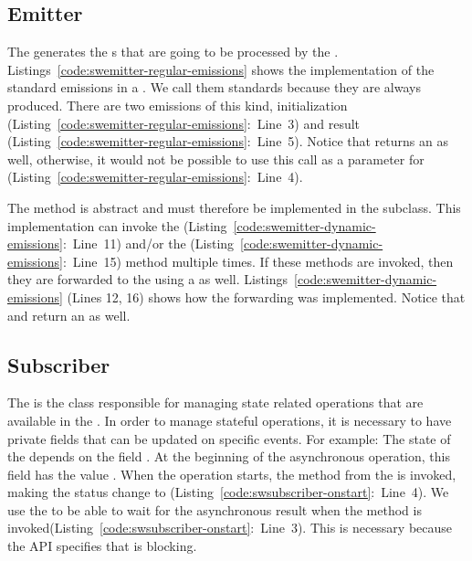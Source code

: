 \documentclass[type=bsc,accentcolor=tud9c]{tudthesis}
\begin{document}
\subsection{Emitter}
\label{sec:imp-emitter}
The  generates the s that are going to be processed by the . Listings~\ref{code:swemitter-regular-emissions} shows the implementation of the standard emissions in a . We call them standards because they are always produced. There are two emissions of this kind, initialization (Listing~\ref{code:swemitter-regular-emissions}:~Line~3) and result (Listing~\ref{code:swemitter-regular-emissions}:~Line~5). Notice that  returns an  as well, otherwise, it would not be possible to use this call as a parameter for  (Listing~\ref{code:swemitter-regular-emissions}:~Line~4).



The  method is abstract and must therefore be implemented in the subclass. This implementation can invoke the  (Listing~\ref{code:swemitter-dynamic-emissions}:~Line~11) and/or the  (Listing~\ref{code:swemitter-dynamic-emissions}:~Line~15) method multiple times. If these methods are invoked, then they are forwarded to the  using a  as well. Listings~\ref{code:swemitter-dynamic-emissions} (Lines 12, 16) shows how the forwarding was implemented. Notice that  and  return an  as well.



\subsection{Subscriber}
\label{sec:imp-subscriber}
The  is the class responsible for managing state related operations that are available in the . In order to manage stateful operations, it is necessary to have private fields that can be updated on specific events. For example: The state of the  depends on the field . At the beginning of the asynchronous operation, this field has the value . When the operation starts, the method  from the  is invoked, making the status change to  (Listing~\ref{code:swsubscriber-onstart}:~Line~4). We use the  to be able to wait for the asynchronous result when the  method is invoked(Listing~\ref{code:swsubscriber-onstart}:~Line~3). This is necessary because the  API specifies that  is blocking.
\end{document}
